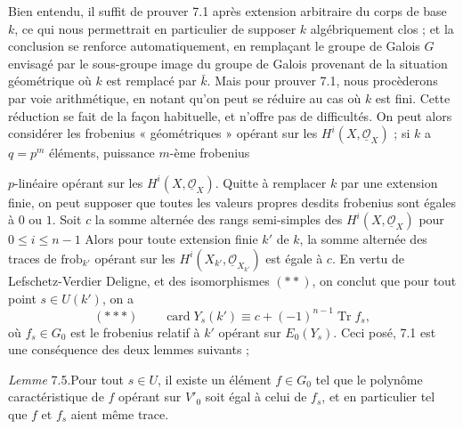 \documentclass[11pt,a4paper]{article}
\begin{document}
Bien entendu, il suffit de prouver 7.1 après extension arbitraire du corps de
base $k$, ce qui nous permettrait en particulier de supposer $k$ algébriquement
clos ; et la conclusion se renforce  automatiquement, en
remplaçant le groupe de Galois $G$ envisagé par le sous-groupe image du groupe
de Galois provenant de la situation géométrique où $k$ est remplacé par
$\bar{k}$. Mais pour prouver 7.1, nous procèderons  par voie
arithmétique, en notant qu'on peut se réduire au cas où $k$ est fini. Cette
réduction se fait de la façon habituelle, et n'offre pas de difficultés. On peut
alors considérer les frobenius « géométriques » opérant sur les $H^i(X,
\underline{\mathcal{O}}_X)$ ; si $k$ a $q = p^m$ éléments, 
  puissance $m$-ème 
frobenius



$p$-linéaire opérant sur les $H^i(X, \underline{\mathcal{O}}_X)$. Quitte
à remplacer $k$ par une extension finie, on peut supposer que toutes les valeurs
propres desdits frobenius sont égales à $0$ ou $1$. Soit $c$ la somme alternée
des rangs semi-simples des $H^i(X, \underline{\mathcal{O}}_X)$ pour $0 \leqslant
i \leqslant n-1$ Alors pour toute extension finie $k'$ de $k$, la somme
alternée des traces de $\mathrm{frob}_{k'}$ opérant sur les $H^i(X_{k'},
\underline{\mathcal{O}}_{X_{k'}})$ est  égale à $c$. En vertu de
Lefschetz-Verdier Deligne, et des isomorphismes $(**)$, on conclut que pour tout
point $s \in U(k')$, on a
\[
(***) \qquad \operatorname{card} Y_s(k') \equiv c + (-1)^{n-1} \operatorname{Tr} f_s ,
\]
où $f_s \in G_0$ est le frobenius relatif à $k'$ opérant sur $E_0(Y_s)$. Ceci
posé, 7.1 est une conséquence des deux lemmes suivants ;

\emph{Lemme} 7.5.\quad Pour tout $s \in U$, il existe un élément $f \in G_0$
 tel que le polynôme
caractéristique de $f$ opérant sur $V'_0$ soit égal à celui de $f_s$, et en
particulier tel que $f$ et $f_s$ aient même trace.
\end{document}
